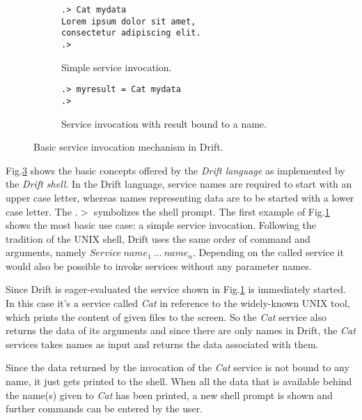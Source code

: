 \begin{figure}[h]
    \centering
    \begin{subfigure}[b]{0.4\textwidth}

  \begin{lstlisting}
.> Cat mydata
Lorem ipsum dolor sit amet,
consectetur adipiscing elit.
.>
  \end{lstlisting}

        \caption{Simple service invocation.}
        \label{cat1}
    \end{subfigure}
    \hspace{20pt} %
    \begin{subfigure}[b]{0.4\textwidth}

  \begin{lstlisting}
.> myresult = Cat mydata
.>
  \end{lstlisting}

        \caption{Service invocation with result bound to a name.}
        \label{cat2}
    \end{subfigure}
    \caption{Basic service invocation mechanism in Drift.}\label{drift-examples1}
\end{figure}

Fig.\ref{drift-examples1} shows the basic concepts offered by
the \textit{Drift language} as implemented by the \textit{Drift shell}.
In the Drift language, service names are required to
start with an upper case letter, whereas names representing
data are to be started with a lower case letter. The $.>$ symbolizes
the shell prompt. The first example of Fig.\ref{cat1}
shows the most basic use case: a simple service invocation.
Following the tradition of the UNIX shell, Drift uses the same
order of command and arguments, namely
$Service\ name_{1}\ ...\ name_{n}$.
Depending on the called service it would also be possible to
invoke services without any parameter names.

Since Drift is eager-evaluated the service shown in
Fig.\ref{cat1} is immediately started. In this case it's
a service called \textit{Cat} in reference to the widely-known
UNIX tool, which prints the content of given files to the screen.
So the \textit{Cat} service also returns the data of its arguments and
since there are only names in Drift, the \textit{Cat} services takes names
as input and returns the data associated with them.

Since the data returned by the invocation of the \textit{Cat} service is
not bound to any name, it just gets printed to the shell. When all
the data that is available behind the name(s) given to \textit{Cat} has been
printed, a new shell prompt is shown and further commands can be entered
by the user.

